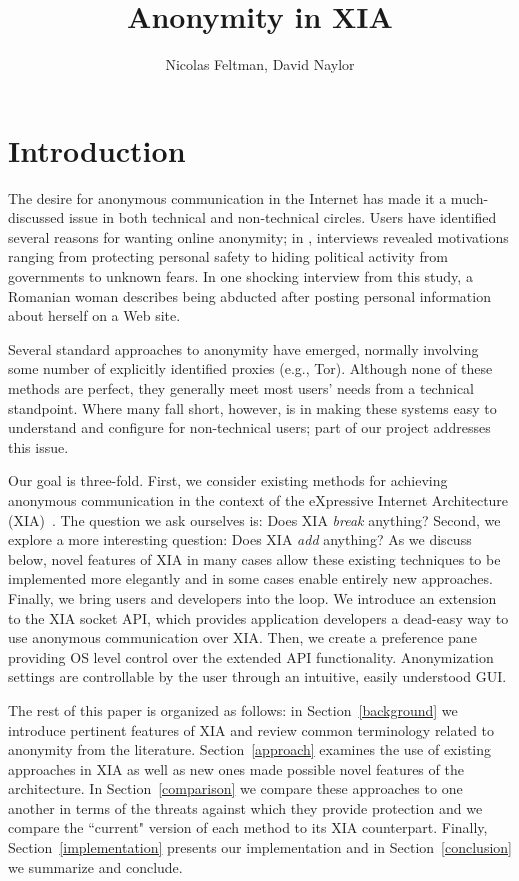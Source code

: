 \documentclass{article}
\title{Anonymity in XIA}
\author{Nicolas Feltman, David Naylor}
\begin{document}
\maketitle

\section{Introduction}
\label{introduction}
The desire for anonymous communication in the Internet has made it a much-discussed issue in both technical and non-technical circles. Users have identified several reasons for wanting online anonymity; in \cite{ruogu}, interviews revealed motivations ranging from protecting personal safety to hiding political activity from governments to unknown fears. In one shocking interview from this study, a Romanian woman describes being abducted after posting personal information about herself on a Web site.

Several standard approaches to anonymity have emerged, normally involving some number of explicitly identified proxies (e.g., Tor). Although none of these methods are perfect, they generally meet most users' needs from a technical standpoint. Where many fall short, however, is in making these systems easy to understand and configure for non-technical users; part of our project addresses this issue.

Our goal is three-fold. First, we consider existing methods for achieving anonymous communication in the context of the eXpressive Internet Architecture (XIA)~\cite{xia}. The question we ask ourselves is: Does XIA {\em break} anything? Second, we explore a more interesting question: Does XIA {\em add} anything? As we discuss below, novel features of XIA in many cases allow these existing techniques to be implemented more elegantly and in some cases enable entirely new approaches. Finally, we bring users and developers into the loop. We introduce an extension to the XIA socket API, which provides application developers a dead-easy way to use anonymous communication over XIA. Then, we create a preference pane providing OS level control over the extended API functionality. Anonymization settings are controllable by the user through an intuitive, easily understood GUI.

The rest of this paper is organized as follows: in Section~\ref{background} we introduce pertinent features of XIA and review common terminology related to anonymity from the literature. Section~\ref{approach} examines the use of existing approaches in XIA as well as new ones made possible novel features of the architecture. In Section~\ref{comparison} we compare these approaches to one another in terms of the threats against which they provide protection and we compare the ``current" version of each method to its XIA counterpart. Finally, Section~\ref{implementation} presents our implementation and in Section~\ref{conclusion} we summarize and conclude.
\end{document}
